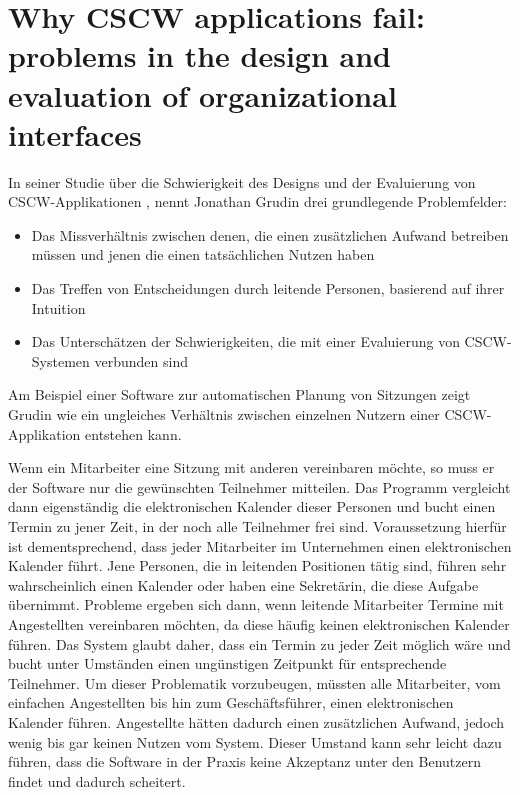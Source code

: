 \section{Why CSCW applications fail: problems in the design and evaluation of organizational interfaces}

In seiner Studie über die Schwierigkeit des Designs und der Evaluierung von CSCW-Applikationen \citep{Grudin:1988p126}, nennt Jonathan Grudin drei grundlegende Problemfelder:

\begin{itemize}
	\item
	Das Missverhältnis zwischen denen, die einen zusätzlichen Aufwand betreiben müssen und jenen die einen tatsächlichen Nutzen haben
	\item
	Das Treffen von Entscheidungen durch leitende Personen, basierend auf ihrer Intuition
	\item
	Das Unterschätzen der Schwierigkeiten, die mit einer Evaluierung von CSCW-Systemen verbunden sind
\end{itemize}

Am Beispiel einer Software zur automatischen Planung von Sitzungen zeigt Grudin wie ein ungleiches Verhältnis zwischen einzelnen Nutzern einer CSCW-Applikation entstehen kann. 

Wenn ein Mitarbeiter eine Sitzung mit anderen vereinbaren möchte, so muss er der Software nur die gewünschten Teilnehmer mitteilen. Das Programm vergleicht dann eigenständig die elektronischen Kalender dieser Personen und bucht einen Termin zu jener Zeit, in der noch alle Teilnehmer frei sind. Voraussetzung hierfür ist dementsprechend, dass jeder Mitarbeiter im Unternehmen einen elektronischen Kalender führt. Jene Personen, die in leitenden Positionen tätig sind, führen sehr wahrscheinlich einen Kalender oder haben eine Sekretärin, die diese Aufgabe übernimmt. Probleme ergeben sich dann, wenn leitende Mitarbeiter Termine mit Angestellten vereinbaren möchten, da diese häufig keinen elektronischen Kalender führen. Das System glaubt daher, dass ein Termin zu jeder Zeit möglich wäre und bucht unter Umständen einen ungünstigen Zeitpunkt für entsprechende Teilnehmer. Um dieser Problematik vorzubeugen, müssten alle Mitarbeiter, vom einfachen Angestellten bis hin zum Geschäftsführer, einen elektronischen Kalender führen.  Angestellte hätten dadurch einen zusätzlichen Aufwand, jedoch wenig bis gar keinen Nutzen vom System. Dieser Umstand kann sehr leicht dazu führen, dass die Software in der Praxis keine Akzeptanz unter den Benutzern findet und dadurch scheitert.

